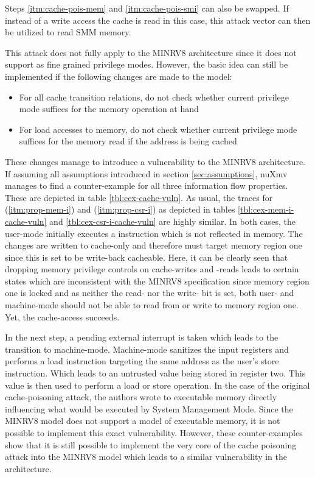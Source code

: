 Steps \ref{itm:cache-pois-mem} and \ref{itm:cache-pois-smi} can also be swapped.
If instead of a write access the cache is read in this case, this attack vector can then be utilized to read SMM memory.

This attack does not fully apply to the MINRV8 architecture since it does not support as fine grained privilege modes.
However, the basic idea can still be implemented if the following changes are made to the model:
\begin{itemize}
    \item For all cache transition relations, do not check whether current privilege mode suffices for the memory operation at hand
    \item For load accesses to memory, do not check whether current privilege mode suffices for the memory read if the address is being cached
\end{itemize}

These changes manage to introduce a vulnerability to the MINRV8 architecture.
If assuming all assumptions introduced in section \ref{sec:assumptions}, nuXmv manages to find a counter-example for all three information flow properties.
These are depicted in table \ref{tbl:cex-cache-vuln}.
As usual, the traces for  (\ref{itm:prop-mem-i}) and  (\ref{itm:prop-csr-i}) as depicted in tables \ref{tbl:cex-mem-i-cache-vuln} and \ref{tbl:cex-csr-i-cache-vuln} are highly similar.
In both cases, the user-mode initially executes a  instruction which is not reflected in memory.
The changes are written to cache-only and therefore must target memory region one since this is set to be write-back cacheable.
Here, it can be clearly seen that dropping memory privilege controls on cache-writes and -reads leads to certain states which are inconsistent with the MINRV8 specification since memory region one is locked and as neither the read- nor the write- bit is set, both user- and machine-mode should not be able to read from or write to memory region one.
Yet, the cache-access succeeds.

In the next step, a pending external interrupt is taken which leads to the transition to machine-mode.
Machine-mode sanitizes the input registers and performs a load instruction targeting the same address as the user's store instruction.
Which leads to an untrusted value being stored in register two.
This value is then used to perform a load or store operation.
In the case of the original cache-poisoning attack, the authors wrote to executable memory directly influencing what would be executed by System Management Mode.
Since the MINRV8 model does not support a model of executable memory, it is not possible to implement this exact vulnerability.
However, these counter-examples show that it is still possible to implement the very core of the cache poisoning attack into the MINRV8 model which leads to a similar vulnerability in the architecture.

